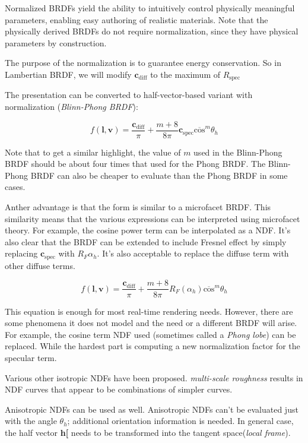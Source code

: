 \documentclass[10pt, a4paper]{article}
\begin{document}
        Normalized BRDFs yield the ability to intuitively control physically meaningful parameters, enabling easy authoring of realistic materials. Note that the physically derived BRDFs do not require normalization, since they have physical parameters by construction. 

        The purpose of the normalization is to guarantee energy conservation. So in Lambertian BRDF, we will modify $\textbf{c}_{\text{diff}}$ to the maximum of $R_{\text{spec}}$
        
        The presentation can be converted to half-vector-based variant with normalization (\emph{Blinn-Phong BRDF}): 

        $$f(\textbf{l}, \textbf{v}) = \frac{\textbf{c}_{\text{diff}}}{\pi} + \frac{m + 8}{8\pi}\textbf{c}_{\text{spec}}\overline{\text{cos}}^m\theta_h$$ 

        Note that to get a similar highlight, the value of $m$ used in the Blinn-Phong BRDF should be about four times that used for the Phong BRDF. The Blinn-Phong BRDF can also be cheaper to evaluate than the Phong BRDF in some cases. 

        Anther advantage is that the form is similar to a microfacet BRDF. This similarity means that the various expressions can be interpreted using microfacet theory. For example, the cosine power term can be interpolated as a NDF. It's also clear that the BRDF can be extended to include Fresnel effect by simply replacing $\textbf{c}_{\text{spec}}$ with $R_F{\alpha_h}$. It's also acceptable to replace the diffuse term with other diffuse terms. 

        $$f(\textbf{l}, \textbf{v}) = \frac{\textbf{c}_{\text{diff}}}{\pi} + \frac{m + 8}{8\pi}R_F(\alpha_h)\overline{\text{cos}}^m\theta_h$$ 
        
        This equation is enough for most real-time rendering needs. However, there are some phenomena it does not model and the need or a different BRDF will arise. For example, the cosine term NDF used (sometimes called a \emph{Phong lobe}) can be replaced. While the hardest part is computing a new normalization factor for the specular term. 
        
        Various other isotropic NDFs have been proposed. \emph{multi-scale roughness} results in NDF curves that appear to be combinations of simpler curves. 

        Anisotropic NDFs can be used as well. Anisotropic NDFs can't be evaluated just with the angle $\theta_h$; additional orientation information is needed. In general case, the half vector \textbf{h[} needs to be transformed into the tangent space(\emph{local frame}).
\end{document}
